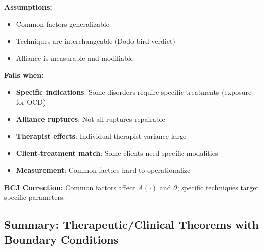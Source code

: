 \begin{tcolorbox}[colback=red!5!white, colframe=red!75!black, title=Boundary Condition: Where Integration Fails]
\textbf{Assumptions:}
\begin{itemize}[nosep]
\item Common factors generalizable
\item Techniques are interchangeable (Dodo bird verdict)
\item Alliance is measurable and modifiable
\end{itemize}

\textbf{Fails when:}
\begin{itemize}[nosep]
\item \textbf{Specific indications}: Some disorders require specific treatments (exposure for OCD)
\item \textbf{Alliance ruptures}: Not all ruptures repairable
\item \textbf{Therapist effects}: Individual therapist variance large
\item \textbf{Client-treatment match}: Some clients need specific modalities
\item \textbf{Measurement}: Common factors hard to operationalize
\end{itemize}

\textbf{BCJ Correction:} Common factors affect $A(\cdot)$ and $\theta$; specific techniques target specific parameters.
\end{tcolorbox}

\subsection{Summary: Therapeutic/Clinical Theorems with Boundary Conditions}

